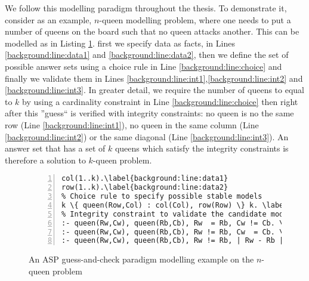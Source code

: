 We follow this modelling paradigm throughout the thesis. To demonstrate it, consider as an example, $n$-queen modelling problem, where one needs to put a number of queens on the board such that no queen attacks another. This can be modelled as in Listing \ref{lst:n_queens_example_modelling}. first we specify data as facts, in Lines \ref{background:line:data1} and \ref{background:line:data2}, then we define the set of possible answer sets using a choice rule in Line \ref{background:line:choice} and finally we validate them in Lines \ref{background:line:int1},\ref{background:line:int2} and \ref{background:line:int3}. 
\pubrev
In greater detail, we require the number of queens to equal to $k$ by using a cardinality constraint in Line \ref{background:line:choice} then right after this ''guess`` is verified with integrity constraints: no queen is no the same row (Line \ref{background:line:int1}), no queen in the same column (Line \ref{background:line:int2}) or the same diagonal (Line \ref{background:line:int3}). An answer set that has a set of $k$ queens which satisfy the integrity constraints is therefore a solution to $k$-queen problem.
\pubrevend

\begin{figure}[H] 
\renewcommand\figurename{Listing}
\begin{Verbatim}[fontsize=\small,numbers=left,xleftmargin=0mm,commandchars=\\\{\},frame=single]
% Data specifying the board
col(1..k).\label{background:line:data1}
row(1..k).\label{background:line:data2}
% Choice rule to specify possible stable models
k \{ queen(Row,Col) : col(Col), row(Row) \} k. \label{background:line:choice}
% Integrity constraint to validate the candidate models
:- queen(Rw,Cw), queen(Rb,Cb), Rw  = Rb, Cw != Cb. \label{background:line:int1}
:- queen(Rw,Cw), queen(Rb,Cb), Rw != Rb, Cw  = Cb. \label{background:line:int2}
:- queen(Rw,Cw), queen(Rb,Cb), Rw != Rb, | Rw - Rb | = | Cw - Cb |.\label{background:line:int3}
\end{Verbatim}
\caption{An ASP guess-and-check paradigm modelling example on the $n$-queen problem}
\label{lst:n_queens_example_modelling}
\end{figure}


